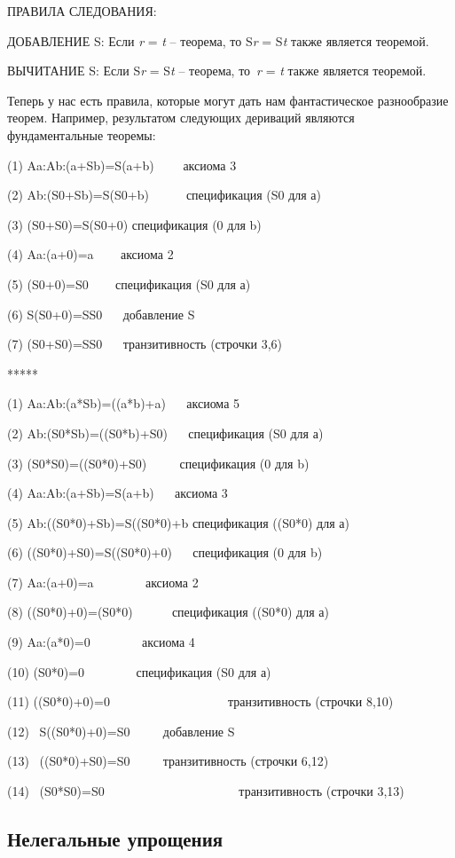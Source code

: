\documentclass[../main.tex]{subfiles}
\begin{document}
ПРАВИЛА СЛЕДОВАНИЯ:

ДОБАВЛЕНИЕ S: Если \emph{r} = \emph{t} \--- теорема, то S\emph{r} = S\emph{t} также является теоремой.

ВЫЧИТАНИЕ S: Если S\emph{r} = S\emph{t} \--- теорема, то~\emph{r} = \emph{t} также является теоремой.

Теперь у нас есть правила, которые могут дать нам фантастическое разнообразие теорем. Например, результатом следующих дериваций являются фундаментальные теоремы:

(1) Aa:Ab:(a+Sb)=S(a+b)~~~~ аксиома 3

(2) Ab:(S0+Sb)=S(S0+b)~~~~~~спецификация (S0 для а)

(3) (S0+S0)=S(S0+0) спецификация (0 для b)

(4) Aa:(a+0)=a ~~~ аксиома 2

(5) (S0+0)=S0 ~~~ спецификация (S0 для а)

(6) S(S0+0)=SS0 ~~ добавление S

(7) (S0+S0)=SS0 ~~ транзитивность (строчки 3,6)

*****

(1) Aa:Ab:(a*Sb)=((a*b)+a) ~~ аксиома 5

(2) Ab:(S0*Sb)=((S0*b)+S0) ~~ спецификация (S0 для а)

(3) (S0*S0)=((S0*0)+S0) ~~~~ спецификация (0 для b)

(4) Aa:Ab:(a+Sb)=S(a+b) ~~ аксиома 3

(5) Ab:((S0*0)+Sb)=S((S0*0)+b спецификация ((S0*0) для а)

(6) ((S0*0)+S0)=S((S0*0)+0) ~~ спецификация (0 для b)

(7) Aa:(a+0)=a ~~~~~~~ аксиома 2

(8) ((S0*0)+0)=(S0*0) ~~~~~ спецификация ((S0*0) для а)

(9) Aa:(a*0)=0 ~~~~~~~ аксиома 4

(10) (S0*0)=0 ~~~~~~~ спецификация (S0 для а)

(11) ((S0*0)+0)=0~~~~~~~~~~~~~~~~~~~транзитивность (строчки 8,10)

(12)~ S((S0*0)+0)=S0 ~~~~ добавление S

(13)~ ((S0*0)+S0)=S0 ~~~~ транзитивность (строчки 6,12)

(14)~ (S0*S0)=S0~~~~~~~~~~~~~~~~~~~~~ транзитивность (строчки 3,13)


\subsection{Нелегальные упрощения}
\end{document}
